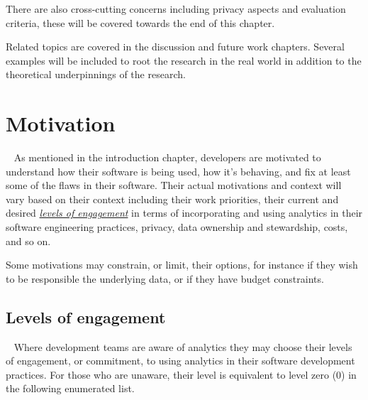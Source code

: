There are also cross-cutting concerns including privacy aspects and evaluation criteria, these will be covered towards the end of this chapter.



Related topics are covered in the discussion and future work chapters. Several examples will be included to root the research in the real world in addition to the theoretical underpinnings of the research. 

\section{Motivation}~\label{motivation-section}
As mentioned in the introduction chapter, developers are motivated to understand how their software is being used, how it's behaving, and fix at least some of the flaws in their software. Their actual motivations and context will vary based on their context including their work priorities, their current and desired \href{subsection-levels-of-engagement}{\emph{levels of engagement}} in terms of incorporating and using analytics in their software engineering practices, privacy, data ownership and stewardship, costs, and so on.

Some motivations may constrain, or limit, their options, for instance if they wish to be responsible the underlying data, or if they have budget constraints.

\subsection{Levels of engagement}~\label{subsection-levels-of-engagement}
Where development teams are aware of analytics they may choose their levels of engagement, or commitment, to using analytics in their software development practices. For those who are unaware, their level is equivalent to level zero (0) in the following enumerated list. 

